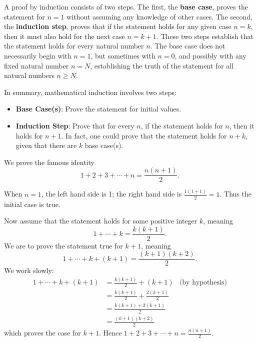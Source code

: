A proof by induction consists of two steps. The first, the \textbf{base case}, proves the statement for $n = 1$ without assuming any knowledge of other cases. The second, the \textbf{induction step}, proves that if the statement holds for any given case $n = k$, then it must also hold for the next case $n = k + 1$. These two steps establish that the statement holds for every natural number $n$. The base case does not necessarily begin with $n = 1$, but sometimes with $n = 0$, and possibly with any fixed natural number $n = N$, establishing the truth of the statement for all natural numbers $n \geq N$.

In summary, mathematical induction involves two steps:
\begin{itemize}
    \item \textbf{Base Case(s)}: Prove the statement for initial values.
    \item \textbf{Induction Step}: Prove that for every $n$, if the statement holds for $n$, then it holds for $n + 1$. In fact, one could prove that the statement holds for $n + k$, given that there are $k$ base case(s).
\end{itemize}

\begin{example}
    We prove the famous identity
    \[
        1 + 2 + 3 + \cdots + n = \frac{n(n+1)}2.
    \]

    When $n = 1$, the left hand side is 1; the right hand side is $\frac{1(1+1)}{2} = 1$. Thus the initial case is true.

    Now assume that the statement holds for some positive integer $k$, meaning
    \[
        1 + \cdots + k = \frac{k(k+1)}2.
    \]
    We are to prove the statement true for $k+1$, meaning
    \[
        1 + \cdots + k + (k+1) = \frac{(k+1)(k+2)}2.
    \]
    We work slowly:
    \begin{align*}
        1 + \cdots + k + (k+1) &= \frac{k(k+1)}{2} + (k+1) & \text{(by hypothesis)}\\
        &= \frac{k(k+1)}2 + \frac{2(k+1)}{2}\\
        &= \frac{k(k+1) + 2(k+1)}2\\
        &= \frac{(k+1)(k+2)}2
    \end{align*}
    which proves the case for $k + 1$. Hence $1 + 2 + 3 + \cdots + n = \frac{n(n+1)}2$.
\end{example}

